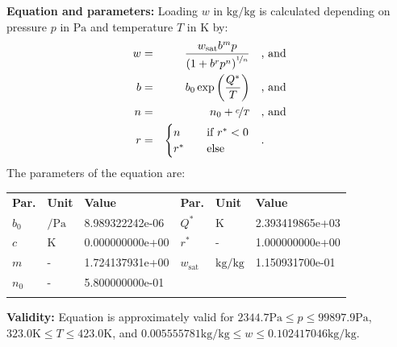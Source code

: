 \textbf{Equation and parameters:}
\newline
%
Loading $w$ in $\si{\kilogram\per\kilogram}$ is calculated depending on pressure $p$ in $\si{\pascal}$ and temperature $T$ in $\si{\kelvin}$ by:
%
\begin{equation*}
\begin{split}
w &=& \frac{w_\mathrm{sat} b^{m} p}{\left( 1 + b^{r} p^{n} \right)^{\nicefrac{1}{n}}} & \quad\text{, and} \\
b &=& b_0 \exp\left( \frac{Q^{*}}{T} \right) & \quad\text{, and} \\
n &=& n_0 + \nicefrac{c}{T} & \quad\text{, and} \\
r &=& \begin{cases} n & \quad \text{if } r^{*} < 0 \\ r^{*}  & \quad \text{else} \end{cases} & \quad\text{.}
\end{split}
\end{equation*}
%
The parameters of the equation are:
%
\begin{longtable}[l]{lll|lll}
\toprule
\addlinespace
\textbf{Par.} & \textbf{Unit} & \textbf{Value} &	\textbf{Par.} & \textbf{Unit} & \textbf{Value} \\
\addlinespace
\midrule
\endhead

\bottomrule
\endfoot
\bottomrule
\endlastfoot
\addlinespace

$b_0$ & $\si{\per\pascal}$ & 8.989322242e-06 & $Q^{*}$ & $\si{\kelvin}$ & 2.393419865e+03 \\
$c$ & $\si{\kelvin}$ & 0.000000000e+00 & $r^{*}$ & - & 1.000000000e+00 \\
$m$ & - & 1.724137931e+00 & $w_\mathrm{sat}$ & $\si{\kilogram\per\kilogram}$ & 1.150931700e-01 \\
$n_0$ & - & 5.800000000e-01 & & & \\

\addlinespace\end{longtable}

\textbf{Validity:}
\newline
Equation is approximately valid for $2344.7 \si{\pascal} \leq p \leq 99897.9 \si{\pascal}$,  $323.0 \si{\kelvin} \leq T \leq 423.0 \si{\kelvin}$, and $0.005555781 \si{\kilogram\per\kilogram} \leq w \leq 0.102417046 \si{\kilogram\per\kilogram}$.
\newline

